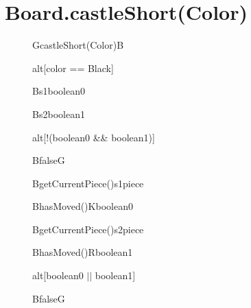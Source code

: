 \documentclass[8pt]{article}
\begin{document}
\section{Board.castleShort(Color)}
\begin{figure}[H]
	\centering
  	\begin{adjustbox}{height=\textheight}
		\begin{sequencediagram}
			\begin{messcall}{G}{castleShort(Color)}{B}
				\begin{sdblock}{alt}{[color == Black]}
					\begin{call}{B}{}{s1}{boolean0}	
					\end{call}	
					\begin{call}{B}{}{s2}{boolean1}	
					\end{call}	
				    \begin{sdblock}{alt}{[!(boolean0 \&\& boolean1)]}
				   		\begin{messcall}{B}{false}{G}
				   		\end{messcall}
					\end{sdblock}
					
					\begin{call}{B}{getCurrentPiece()}{s1}{piece}	
					\end{call}	
					\begin{call}{B}{hasMoved()}{K}{boolean0}	
					\end{call}
					\begin{call}{B}{getCurrentPiece()}{s2}{piece}	
					\end{call}	
					\begin{call}{B}{hasMoved()}{R}{boolean1}	
					\end{call}
				    \begin{sdblock}{alt}{[boolean0 $ || $ boolean1]}
				   		\begin{messcall}{B}{false}{G}
				   		\end{messcall}
					\end{sdblock}
					

\end{sdblock}
\end{messcall}
\end{sequencediagram}
\end{adjustbox}
\end{figure}
\end{document}
